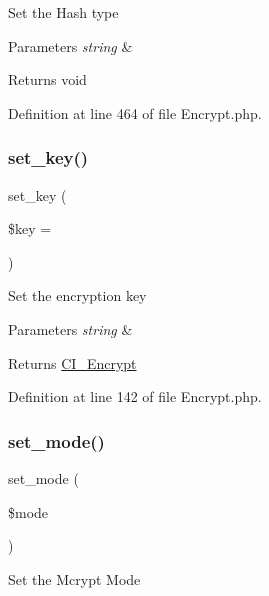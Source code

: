 Set the Hash type


\begin{DoxyParams}{Parameters}
{\em string} & \\
\hline
\end{DoxyParams}
\begin{DoxyReturn}{Returns}
void 
\end{DoxyReturn}


Definition at line 464 of file Encrypt.\+php.

\mbox{\label{class_c_i___encrypt_ac8f224ccad805d0bcdf4ab7722058ae2}} 
\subsubsection{\texorpdfstring{set\_key()}{set\_key()}}
{\footnotesize\ttfamily set\+\_\+key (\begin{DoxyParamCaption}\item[{}]{\$key = {\ttfamily \textquotesingle{}\textquotesingle{}} }\end{DoxyParamCaption})}

Set the encryption key


\begin{DoxyParams}{Parameters}
{\em string} & \\
\hline
\end{DoxyParams}
\begin{DoxyReturn}{Returns}
\mbox{\hyperlink{class_c_i___encrypt}{C\+I\+\_\+\+Encrypt}} 
\end{DoxyReturn}


Definition at line 142 of file Encrypt.\+php.

\mbox{\label{class_c_i___encrypt_ab32fd90a4ac2df4be1e56460d6f6daa3}} 
\subsubsection{\texorpdfstring{set\_mode()}{set\_mode()}}
{\footnotesize\ttfamily set\+\_\+mode (\begin{DoxyParamCaption}\item[{}]{\$mode }\end{DoxyParamCaption})}

Set the Mcrypt Mode


